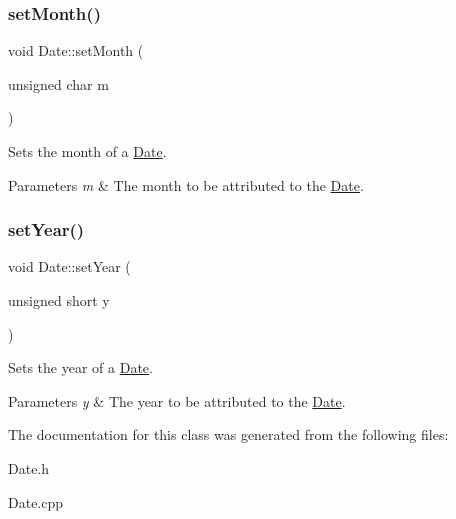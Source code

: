 \subsubsection{\texorpdfstring{set\+Month()}{setMonth()}}
{\footnotesize\ttfamily void Date\+::set\+Month (\begin{DoxyParamCaption}\item[{unsigned char}]{m }\end{DoxyParamCaption})}



Sets the month of a \hyperlink{classDate}{Date}. 


\begin{DoxyParams}{Parameters}
{\em m} & The month to be attributed to the \hyperlink{classDate}{Date}. \\
\hline
\end{DoxyParams}
\mbox{\label{classDate_a081df32ac89f7a92bffcd714f0570dba}} 
\subsubsection{\texorpdfstring{set\+Year()}{setYear()}}
{\footnotesize\ttfamily void Date\+::set\+Year (\begin{DoxyParamCaption}\item[{unsigned short}]{y }\end{DoxyParamCaption})}



Sets the year of a \hyperlink{classDate}{Date}. 


\begin{DoxyParams}{Parameters}
{\em y} & The year to be attributed to the \hyperlink{classDate}{Date}. \\
\hline
\end{DoxyParams}


The documentation for this class was generated from the following files\+:\begin{DoxyCompactItemize}
\item 
Date.\+h\item 
Date.\+cpp\end{DoxyCompactItemize}
